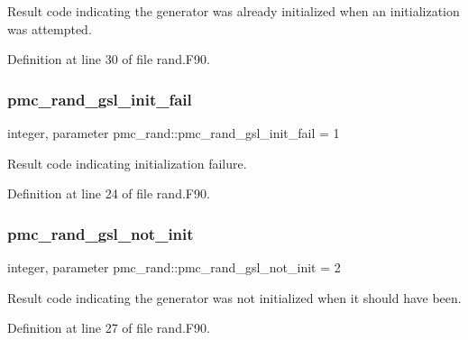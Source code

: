 Result code indicating the generator was already initialized when an initialization was attempted. 



Definition at line 30 of file rand.\+F90.

\mbox{\label{namespacepmc__rand_a61fd879b01560eb3c93b8e8548469c03}} 
\subsubsection{\texorpdfstring{pmc\+\_\+rand\+\_\+gsl\+\_\+init\+\_\+fail}{pmc\_rand\_gsl\_init\_fail}}
{\footnotesize\ttfamily integer, parameter pmc\+\_\+rand\+::pmc\+\_\+rand\+\_\+gsl\+\_\+init\+\_\+fail = 1}



Result code indicating initialization failure. 



Definition at line 24 of file rand.\+F90.

\mbox{\label{namespacepmc__rand_aac2309eecd307a2b026d521d5dfdb58c}} 
\subsubsection{\texorpdfstring{pmc\+\_\+rand\+\_\+gsl\+\_\+not\+\_\+init}{pmc\_rand\_gsl\_not\_init}}
{\footnotesize\ttfamily integer, parameter pmc\+\_\+rand\+::pmc\+\_\+rand\+\_\+gsl\+\_\+not\+\_\+init = 2}



Result code indicating the generator was not initialized when it should have been. 



Definition at line 27 of file rand.\+F90.

\mbox{\label{namespacepmc__rand_ae92b9bb82c9825f509a7833ba419477b}} 
